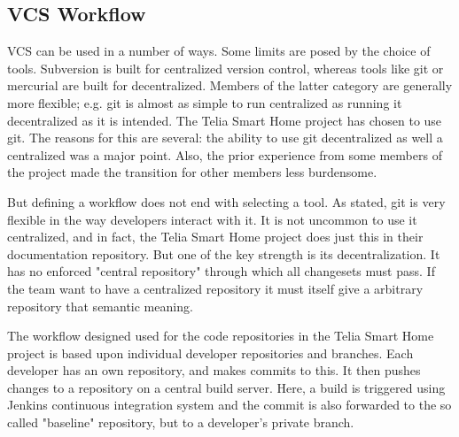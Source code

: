 \documentclass{article}
\begin{document}
%
%
%

\subsection{VCS Workflow}

VCS can be used in a number of ways. Some limits are posed by the choice
of tools. Subversion is built for centralized version control, whereas
tools like git or mercurial are built for decentralized. Members of the 
latter category are generally more flexible; e.g. git is almost as simple 
to run centralized as running it decentralized as it is intended. The 
Telia Smart Home project has chosen to use git. The reasons for this are
several: the ability to use git decentralized as well a centralized was a
major point. Also, the prior experience from some members of the project
made the transition for other members less burdensome.

But defining a workflow does not end with selecting a tool. As stated, 
git is very flexible in the way developers interact with it. It is not
uncommon to use it centralized, and in fact, the Telia Smart Home project
does just this in their documentation repository. But one of the key 
strength is its decentralization. It has no enforced "central repository"
through which all changesets must pass. If the team want to have a 
centralized repository it must itself give a arbitrary repository that
semantic meaning.

The workflow designed used for the code repositories in the Telia Smart 
Home project is based upon individual developer repositories and branches.
Each developer has an own repository, and makes commits to this. It then
pushes changes to a repository on a central build server. Here, a build
is triggered using Jenkins continuous integration system and the commit is
also forwarded to the so called "baseline" repository, but to a developer's
private branch.
\end{document}
